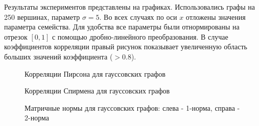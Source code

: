Результаты экспериментов представлены на графиках. Использовались графы на 250 вершинах, параметр $\sigma = 5$.
Во всех случаях по оси $x$ отложены значения параметра семейства. Для удобства все параметры были отнормированы на отрезок $[0,1]$ с помощью дробно-линейного преобразования. В случае коэффициентов корреляции правый рисунок показывает увеличенную область больших значений коэффициента ($>0.8$).

\begin{figure}[h]
  \begin{minipage}[h]{0.49\linewidth}
  \end{minipage}
  \hfill
  \begin{minipage}[h]{0.49\linewidth}
  \end{minipage}

  \caption{Корреляции Пирсона для гауссовских графов}
  \label{img:wei_graphs}  
\end{figure}

\begin{figure}[h]
  \begin{minipage}[h]{0.49\linewidth}
  \end{minipage}
  \hfill
  \begin{minipage}[h]{0.49\linewidth}
  \end{minipage}

  \caption{Корреляции Спирмена для гауссовских графов}
  \label{img:wei_graphs_sp}  
\end{figure}


\begin{figure}[h]
  \begin{minipage}[h]{0.49\linewidth}
  \end{minipage}
  \hfill
  \begin{minipage}[h]{0.49\linewidth}
  \end{minipage}

  \caption{Матричные нормы для гауссовских графов: слева - 1-норма, справа - 2-норма}
  \label{img:wei_graphs_norm}  
\end{figure}

